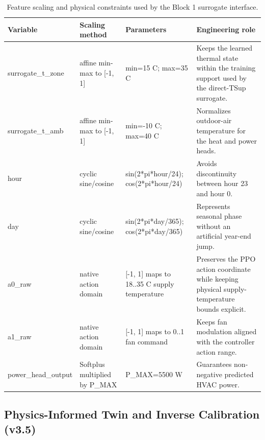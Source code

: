 \documentclass[11pt,a4paper]{article}
\begin{document}
\begin{table}[H]
\centering
\scriptsize
\caption{Feature scaling and physical constraints used by the Block 1 surrogate interface.}
\label{tab:v3-scaling}
\begin{tabularx}{\linewidth}{lXXX}
\toprule
Variable & Scaling method & Parameters & Engineering role \\
\midrule
surrogate\_t\_zone & affine min-max to [-1, 1] & min=15 C; max=35 C & Keeps the learned thermal state within the training support used by the direct-TSup surrogate. \\
surrogate\_t\_amb & affine min-max to [-1, 1] & min=-10 C; max=40 C & Normalizes outdoor-air temperature for the heat and power heads. \\
hour & cyclic sine/cosine & sin(2*pi*hour/24); cos(2*pi*hour/24) & Avoids discontinuity between hour 23 and hour 0. \\
day & cyclic sine/cosine & sin(2*pi*day/365); cos(2*pi*day/365) & Represents seasonal phase without an artificial year-end jump. \\
a0\_raw & native action domain & [-1, 1] maps to 18..35 C supply temperature & Preserves the PPO action coordinate while keeping physical supply-temperature bounds explicit. \\
a1\_raw & native action domain & [-1, 1] maps to 0..1 fan command & Keeps fan modulation aligned with the controller action range. \\
power\_head\_output & Softplus multiplied by P\_MAX & P\_MAX=5500 W & Guarantees non-negative predicted HVAC power. \\
\bottomrule
\end{tabularx}
\end{table}

\subsection{Physics-Informed Twin and Inverse Calibration (v3.5)}
\label{ssec:block1-v35-calibration}
\end{document}
